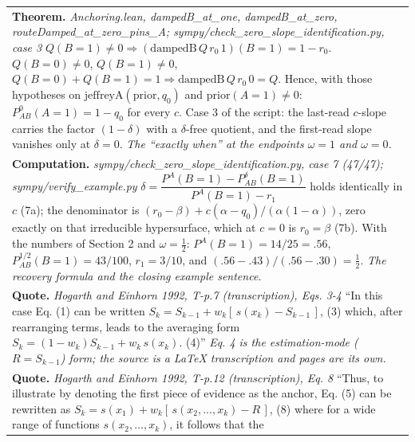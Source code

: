 \documentclass[10pt]{article}
\theoremstyle{definition}
\newlength{\fullw}\setlength{\fullw}{25.9cm}
\begin{document}
{\begin{longtable}{|p{0.9cm}|p{12.2cm}|p{12.2cm}|}
\multicolumn{3}{|p{\fullw}|}{\textbf{Theorem.} \textit{Anchoring.lean, dampedB\_at\_one, dampedB\_at\_zero, routeDamped\_at\_zero\_pins\_A; sympy/check\_zero\_slope\_identification.py, case 3} \newline $Q(B{=}1)\neq0\Rightarrow(\mathrm{dampedB}\,Q\,r_0\,1)(B{=}1)=1-r_0$.
$Q(B{=}0)\neq0$, $Q(B{=}1)\neq0$, $Q(B{=}0)+Q(B{=}1)=1\Rightarrow\mathrm{dampedB}\,Q\,r_0\,0=Q$.
Hence, with those hypotheses on $\mathrm{jeffreyA}(\mathrm{prior},q_0)$ and
$\mathrm{prior}(A{=}1)\neq0$: $P^{0}_{AB}(A{=}1)=1-q_0$ for every $c$. Case 3 of the
script: the last-read $c$-slope carries the factor $(1-\delta)$ with a $\delta$-free
quotient, and the first-read slope vanishes only at $\delta=0$. \newline \textit{The ``exactly when'' at the endpoints $\omega=1$ and $\omega=0$.}} \\
\multicolumn{3}{|p{\fullw}|}{\textbf{Computation.} \textit{sympy/check\_zero\_slope\_identification.py, case 7 (47/47); sympy/verify\_example.py} \newline $\delta=\dfrac{P^{A}(B{=}1)-P^{\delta}_{AB}(B{=}1)}{P^{A}(B{=}1)-r_1}$ holds
identically in $c$ (7a); the denominator is $(r_0-\beta)+c(\alpha-q_0)/(\alpha(1-\alpha))$,
zero exactly on that irreducible hypersurface, which at $c=0$ is $r_0=\beta$ (7b). With the numbers of Section 2 and $\omega=\tfrac12$:
$P^{A}(B{=}1)=14/25=.56$, $P^{1/2}_{AB}(B{=}1)=43/100$, $r_1=3/10$, and
$(.56-.43)/(.56-.30)=\tfrac12$. \newline \textit{The recovery formula and the closing example sentence.}} \\
\multicolumn{3}{|p{\fullw}|}{\textbf{Quote.} \textit{Hogarth and Einhorn 1992, T-p.7 (transcription), Eqs. 3-4} \newline ``In this case Eq. (1) can be written
$S_k = S_{k-1} + w_k[\,s(x_k) - S_{k-1}\,]$, (3) which, after rearranging terms,
leads to the averaging form $S_k = (1 - w_k)S_{k-1} + w_k\,s(x_k)$. (4)'' \newline \textit{Eq. 4 is the estimation-mode ($R=S_{k-1}$) form; the source is a LaTeX transcription and pages are its own.}} \\
\multicolumn{3}{|p{\fullw}|}{\textbf{Quote.} \textit{Hogarth and Einhorn 1992, T-p.12 (transcription), Eq. 8} \newline ``Thus, to illustrate by denoting the first piece of evidence as the anchor,
Eq. (5) can be rewritten as $S_k = s(x_1) + w_k[\,s(x_2, \ldots, x_k) - R\,]$, (8)
where for a wide range of functions $s(x_2, \ldots, x_k)$, it follows that the
}
\end{longtable}}
\end{document}
